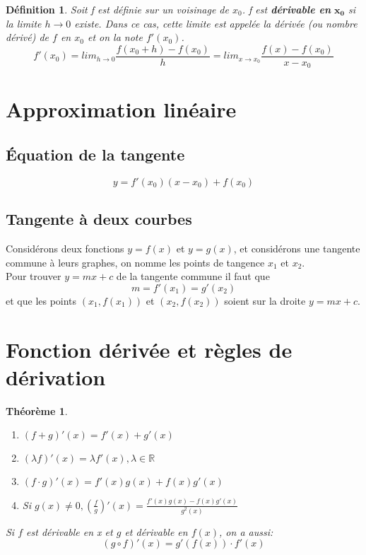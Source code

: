 \documentclass[10pt,a4paper]{book}
\newcommand{\R}{\mathbb{R}}
\newtheorem{theorem}{Théorème}[section]
\newtheorem{definition}{Définition}[section]
\begin{document}
\begin{definition}
Soit f est définie sur un voisinage de $x_0$. f est \textbf{dérivable en} $\mathbf{x_0}$ si la limite $h \rightarrow 0$ existe. Dans ce cas, cette limite est appelée la dérivée (ou nombre dérivé) de $f$ en $x_0$ et on la note $f'(x_0)$.
\begin{equation*}
f'(x_0) = lim_{h \rightarrow 0} \frac{f(x_0 + h) -f(x_0)}{h} = lim_{x \rightarrow x_0} \frac{f(x) - f(x_0)}{x - x_0}
\end{equation*}
\end{definition}

\section{Approximation linéaire}

\subsection{Équation de la tangente}
\begin{equation}
y = f'(x_0)(x-x_0)+f(x_0)
\end{equation}

\subsection{Tangente à deux courbes}

Considérons deux fonctions $y = f(x)$ et $y = g(x)$, et considérons une tangente commune à leurs graphes, on nomme les points de tangence $x_1$ et $x_2$. \\
Pour trouver $y = mx + c$ de la tangente commune il faut que
\[m = f'(x_1) = g'(x_2)\]
et que les points $(x_1, f(x_1))$ et $(x_2, f(x_2))$ soient sur la droite $y = mx + c$.

\section{Fonction dérivée et règles de dérivation}

\begin{theorem}
\begin{enumerate}
\item \((f+g)'(x) = f'(x) + g'(x)\)
\item \((\lambda f)'(x) = \lambda f'(x), \lambda \in \R\)
\item \((f\cdot g)'(x) = f'(x)g(x) + f(x)g'(x)\)
\item Si \(g(x) \neq 0, (\frac{f}{g})'(x) = \frac{f'(x)g(x) - f(x)g'(x)}{g^2(x)}\)
\end{enumerate} 
Si $f$ est dérivable en x et $g$ et dérivable en $f(x)$, on a aussi:
\[(g\circ f)'(x) = g'(f(x))\cdot f'(x)\]
\end{theorem}
\end{document}
